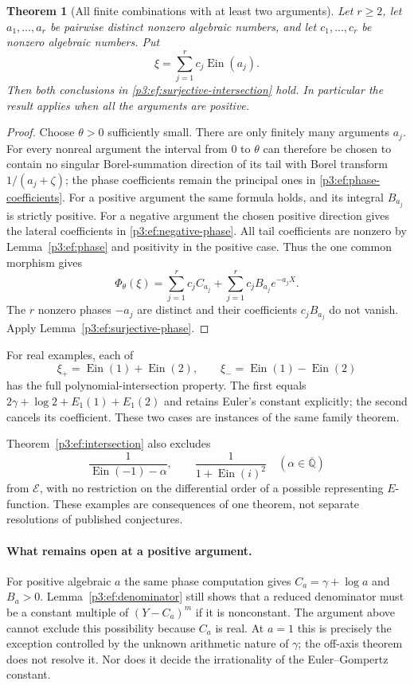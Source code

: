 \documentclass[11pt,a4paper]{article}
\newtheorem{theorem}{Theorem}[section]
\theoremstyle{definition}
\theoremstyle{remark}
\numberwithin{equation}{section}
\begin{document}
\begin{theorem}[All finite combinations with at least two arguments]
\label{p3:ef:multiple-arguments}
Let $r\ge2$, let $a_1,\ldots,a_r$ be pairwise distinct nonzero
algebraic numbers, and let $c_1,\ldots,c_r$ be nonzero algebraic
numbers.  Put
\[
 \xi=\sum_{j=1}^r c_j\operatorname{Ein}(a_j).
\]
Then both conclusions in \eqref{p3:ef:surjective-intersection} hold.
In particular the result applies when all the arguments are positive.
\end{theorem}
\begin{proof}
Choose $\theta>0$ sufficiently small.  There are only finitely many
arguments $a_j$.  For every nonreal argument the interval from $0$ to
$\theta$ can therefore be chosen to contain no singular Borel-summation direction
of its tail with Borel transform $1/(a_j+\zeta)$; the phase coefficients
remain the principal ones in \eqref{p3:ef:phase-coefficients}.  For a
positive argument the same formula holds, and its integral $B_{a_j}$
is strictly positive.  For a negative argument the chosen positive
direction gives the lateral coefficients in \eqref{p3:ef:negative-phase}.
All tail coefficients are nonzero by Lemma~\ref{p3:ef:phase} and
positivity in the positive case.  Thus the one common morphism gives
\[
 \Phi_\theta(\xi)
 =\sum_{j=1}^r c_jC_{a_j}
   +\sum_{j=1}^r c_jB_{a_j}e^{-a_jX}.
\]
The $r$ nonzero phases $-a_j$ are distinct and their coefficients
$c_jB_{a_j}$ do not vanish.  Apply Lemma~\ref{p3:ef:surjective-phase}.
\end{proof}

For real examples, each of
\[
 \xi_+=\operatorname{Ein}(1)+\operatorname{Ein}(2),\qquad
 \xi_-=\operatorname{Ein}(1)-\operatorname{Ein}(2)
\]
has the full polynomial-intersection property.  The first equals
$2\gamma+\log2+E_1(1)+E_1(2)$ and retains Euler's constant explicitly;
the second cancels its coefficient.  These two cases are instances of
the same family theorem.

Theorem~\ref{p3:ef:intersection} also excludes
\[
 \frac1{\operatorname{Ein}(-1)-\alpha},\qquad
 \frac1{1+\operatorname{Ein}(i)^2}
 \quad(\alpha\in\overline{\mathbb Q})
\]
from $\mathcal E$, with no restriction on the differential order of a
possible representing $E$-function.  These examples are consequences
of one theorem, not separate resolutions of published conjectures.

\paragraph{What remains open at a positive argument.}
For positive algebraic $a$ the same phase computation gives
$C_a=\gamma+\log a$ and $B_a>0$.  Lemma~\ref{p3:ef:denominator} still
shows that a reduced denominator must be a constant multiple of
$(Y-C_a)^m$ if it is nonconstant.  The argument above cannot exclude
this possibility because $C_a$ is real.  At $a=1$ this is precisely
the exception controlled by the unknown arithmetic nature of
$\gamma$; the off-axis theorem does not resolve it.  Nor does it
decide the irrationality of the Euler--Gompertz constant.
\end{document}

